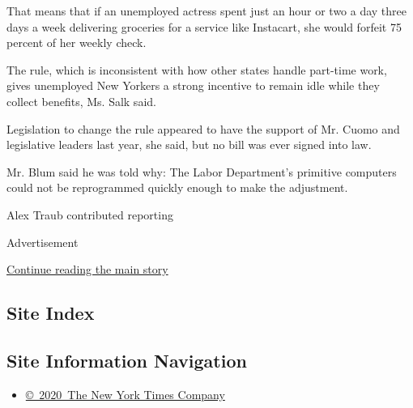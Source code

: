 That means that if an unemployed actress spent just an hour or two a day
three days a week delivering groceries for a service like Instacart, she
would forfeit 75 percent of her weekly check.

The rule, which is inconsistent with how other states handle part-time
work, gives unemployed New Yorkers a strong incentive to remain idle
while they collect benefits, Ms. Salk said.

Legislation to change the rule appeared to have the support of Mr. Cuomo
and legislative leaders last year, she said, but no bill was ever signed
into law.

Mr. Blum said he was told why: The Labor Department's primitive
computers could not be reprogrammed quickly enough to make the
adjustment.

Alex Traub contributed reporting

Advertisement

\protect\hyperlink{after-bottom}{Continue reading the main story}

\hypertarget{site-index}{%
\subsection{Site Index}\label{site-index}}

\hypertarget{site-information-navigation}{%
\subsection{Site Information
Navigation}\label{site-information-navigation}}

\begin{itemize}
\tightlist
\item
  \href{https://help.nytimes3xbfgragh.onion/hc/en-us/articles/115014792127-Copyright-notice}{©~2020~The
  New York Times Company}
\end{itemize}

